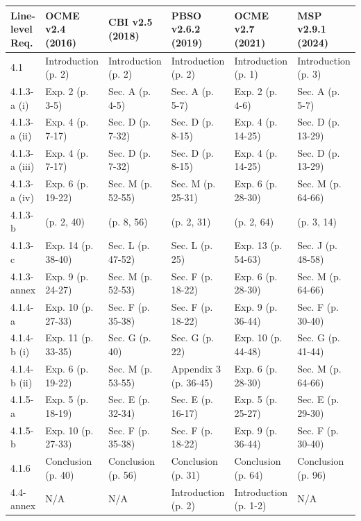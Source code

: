 \label{appendix-b-compliance}
\begin{table}[h]
\begin{tabular}{|  l  |l  |l|l  |l|l  |}
\hline
 \textbf{Line-level Req.} & \textbf{OCME v2.4 (2016)} &  \textbf{CBI v2.5 (2018)} &\textbf{PBSO v2.6.2 (2019)} &  \textbf{OCME v2.7 (2021)} &\textbf{MSP v2.9.1 (2024)}\\ 
 \hline\hline
 4.1 & Introduction (p. 2) &  Introduction (p. 2) &Introduction (p. 2) &  Introduction (p. 1) &Introduction (p. 3) \\  
 \hline
 4.1.3-a (i) & Exp. 2 (p. 3-5) &  Sec. A (p. 4-5) &Sec. A (p. 5-7) &  Exp. 2 (p. 4-6) &Sec. A (p. 5-7) \\
 \hline
 4.1.3-a (ii) & Exp. 4 (p. 7-17) &  Sec. D (p. 7-32) &Sec. D (p. 8-15) &  Exp. 4 (p. 14-25) &Sec. D (p. 13-29)  \\
 \hline
 4.1.3-a (iii) & Exp. 4 (p. 7-17) &  Sec. D (p. 7-32) &Sec. D (p. 8-15) &  Exp. 4 (p. 14-25) &Sec. D (p. 13-29)  \\
 \hline
 4.1.3-a (iv) & Exp. 6 (p. 19-22) &  Sec. M (p. 52-55) &Sec. M (p. 25-31) &  Exp. 6 (p. 28-30) &Sec. M (p. 64-66)\\
 \hline
 4.1.3-b & (p. 2, 40) &  (p. 8, 56)  &(p. 2, 31) &  (p. 2, 64) &(p. 3, 14)  \\
 \hline
 4.1.3-c & Exp. 14 (p. 38-40) &  Sec. L (p. 47-52) &Sec. L (p. 25) &  Exp. 13 (p. 54-63) &Sec. J (p. 48-58)  \\
 \hline
 4.1.3-annex & Exp. 9 (p. 24-27) &  Sec. M (p. 52-53) &Sec. F (p. 18-22) &  Exp. 6 (p. 28-30) &Sec. M (p. 64-66)  \\
 \hline
 4.1.4-a & Exp. 10 (p. 27-33) &  Sec. F (p. 35-38) &Sec. F (p. 18-22) &  Exp. 9 (p. 36-44) &Sec. F (p. 30-40) \\
 \hline
 4.1.4-b (i) & Exp. 11 (p. 33-35) &  Sec. G (p. 40) &Sec. G (p. 22) &  Exp. 10 (p. 44-48) &Sec. G (p. 41-44)  \\
 \hline
 4.1.4-b (ii) & Exp. 6 (p. 19-22) &  Sec. M (p. 53-55) &Appendix 3 (p. 36-45) &  Exp. 6 (p. 28-30) &Sec. M (p. 64-66) \\
 \hline
 4.1.5-a & Exp. 5 (p. 18-19) &  Sec. E (p. 32-34) &Sec. E (p. 16-17) &  Exp. 5 (p. 25-27) &Sec. E (p. 29-30)  \\
 \hline
 4.1.5-b & Exp. 10 (p. 27-33) &  Sec. F (p. 35-38) &Sec. F (p. 18-22) &  Exp. 9 (p. 36-44) &Sec. F (p. 30-40)  \\
 \hline
 4.1.6 & Conclusion (p. 40) &  Conclusion (p. 56) &Conclusion (p. 31) &  Conclusion (p. 64) &Conclusion (p. 96)  \\
 \hline
  4.4-annex & N/A &  N/A &Introduction (p. 2) &  Introduction (p. 1-2) &N/A\\
 \hline
 

\end{tabular}
\end{table}
